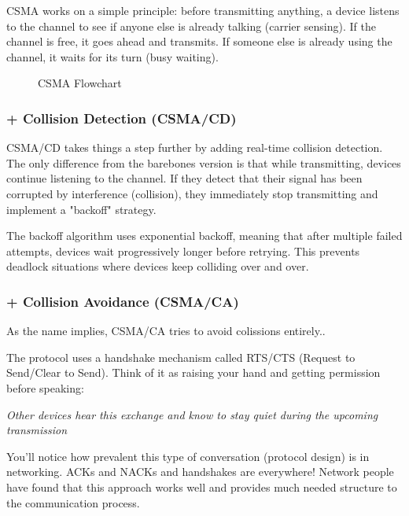 CSMA works on a simple principle: before transmitting anything, a device listens to the channel to see if anyone else is already talking (carrier sensing). If the channel is free, it goes ahead and transmits. If someone else is already using the channel, it waits for its turn (busy waiting).

\begin{figure}[h]
    \centering
    \scalebox{0.7}{}
    \caption{CSMA Flowchart}
    \label{fig:csma-normal}
\end{figure}

\subsubsection{+ Collision Detection (CSMA/CD)}
CSMA/CD takes things a step further by adding real-time collision detection. The only difference from the barebones version is that while transmitting, devices continue listening to the channel. If they detect that their signal has been corrupted by interference (collision), they immediately stop transmitting and implement a "backoff" strategy.

The backoff algorithm uses exponential backoff, meaning that after multiple failed attempts, devices wait progressively longer before retrying. This prevents deadlock situations where devices keep colliding over and over.

\subsubsection{+ Collision Avoidance (CSMA/CA)}
As the name implies, CSMA/CA tries to avoid colissions entirely..

The protocol uses a handshake mechanism called RTS/CTS (Request to Send/Clear to Send). Think of it as raising your hand and getting permission before speaking:

\begin{tcolorbox}[colback=gray!10, colframe=gray!50, arc=3mm, left=2mm, right=2mm, boxrule=1pt, before skip=5mm, after skip=5mm]
    \textit{Other devices hear this exchange and know to stay quiet during the upcoming transmission}
\end{tcolorbox}

You'll notice how prevalent this type of conversation (protocol design) is in networking. ACKs and NACKs and handshakes are everywhere! Network people have found that this approach works well and provides much needed structure to the communication process.

